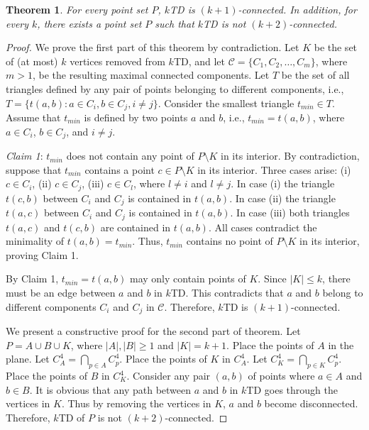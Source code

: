 \documentclass[11pt,a4paper]{article}
\newcommand{\kTD}[2]{$#1$\text{-}TD#2}
\newcommand{\Tm}{t_{min}}
\newtheorem{theorem}{Theorem}
\begin{document}
\begin{theorem}
\label{k-connectivity-thr}
 For every point set $P$, \kTD{k}{} is $(k+1)$-connected. In addition, for every $k$, there exists a point set $P$ such that \kTD{k}{} is not $(k+2)$-connected.
\end{theorem}
\begin{proof}
We prove the first part of this theorem by contradiction. Let $K$ be the set of (at most) $k$ vertices removed from \kTD{k}{}, and let $\mathcal{C}=\{C_1, C_2, \dots, C_m\}$, where $m>1$, be the resulting maximal connected components. Let $T$ be the set of all triangles defined by any pair of points belonging to different components, i.e., $T=\{t(a,b): a\in C_i, b\in C_j, i\neq j\}$. Consider the smallest triangle $\Tm\in T$. Assume that $\Tm$ is defined by two points $a$ and $b$, i.e., $\Tm=t(a,b)$, where $a\in C_i$, $b\in C_j$, and $i\neq j$.

{\em Claim 1}: $\Tm$ does not contain any point of $P\setminus K$ in its interior.
By contradiction, suppose that $\Tm$ contains a point $c\in P\setminus K$ in its interior. Three cases arise: (i) $c\in C_i$, (ii) $c\in C_j$, (iii) $c\in C_l$, where $l\neq i$ and $l\neq j$. In case (i) the triangle $t(c,b)$ between $C_i$ and $C_j$ is contained in $t(a,b)$. In case (ii) the triangle $t(a,c)$ between $C_i$ and $C_j$ is contained in $t(a,b)$. In case (iii) both triangles $t(a,c)$ and  $t(c,b)$ are contained in $t(a,b)$. All cases contradict the minimality of $t(a,b)=\Tm$. Thus, $\Tm$ contains no point of $P\setminus K$ in its interior, proving Claim 1.

By Claim 1, $\Tm=t(a,b)$ may only contain points of $K$. Since $|K|\le k$, there must be an edge between $a$ and $b$ in \kTD{k}{}. This contradicts that $a$ and $b$ belong to different components $C_i$ and $C_j$ in $\mathcal{C}$. Therefore, \kTD{k}{} is $(k+1)$-connected.


We present a constructive proof for the second part of theorem. Let $P=A\cup B\cup K$, where $|A|,|B|\ge 1$ and $|K|=k+1$. Place the points of $A$ in the plane. Let $C_A^{4}=\bigcap_{p\in A}{C_p^4}$. Place the points of $K$ in $C_A^4$. Let $C_K^4=\bigcap_{p\in K}{C_p^4}$. Place the points of $B$ in $C_K^4$. Consider any pair $(a,b)$ of points where $a\in A$ and $b\in B$. It is obvious that any path between $a$ and $b$ in \kTD{k}{} goes through the vertices in $K$. Thus by removing the vertices in $K$, $a$ and $b$ become disconnected. Therefore, \kTD{k}{} of $P$ is not $(k+2)$-connected. 
\end{proof}
\end{document}
